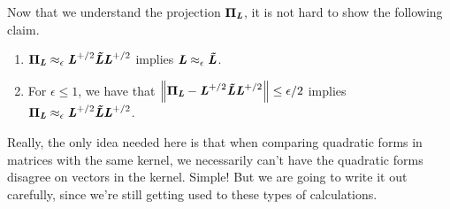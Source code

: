 Now that we understand the projection $\boldsymbol{\Pi}_{\boldsymbol{\mathit{L}}}$, it is not hard to
show the following claim.
\begin{claim}
  \label{clm:spectralreltoabs}
  \noindent
\begin{enumerate}
\item
\label{enu:switchapxnormalizer}
  $\boldsymbol{\Pi}_{\boldsymbol{\mathit{L}}} \approx_{\epsilon} \boldsymbol{\mathit{L}}^{+/2}\boldsymbol{\mathit{\tilde{L}}}\boldsymbol{\mathit{L}}^{+/2}$
  implies $\boldsymbol{\mathit{L}} \approx_{\epsilon} \boldsymbol{\mathit{\tilde{L}}}$.
\item
  \label{enu:normtoapx}
  For $\epsilon \leq 1$, we have that
  $\left\| \boldsymbol{\Pi}_{\boldsymbol{\mathit{L}}} - \boldsymbol{\mathit{L}}^{+/2}\boldsymbol{\mathit{\tilde{L}}}\boldsymbol{\mathit{L}}^{+/2} \right\| \leq
  \epsilon/2$ implies  $\boldsymbol{\Pi}_{\boldsymbol{\mathit{L}}} \approx_{\epsilon} \boldsymbol{\mathit{L}}^{+/2}\boldsymbol{\mathit{\tilde{L}}}\boldsymbol{\mathit{L}}^{+/2}$.
\end{enumerate}
\end{claim}
Really, the only idea needed here is that when comparing quadratic
forms in matrices with
the same kernel, we necessarily can't have the quadratic forms
disagree on vectors in the kernel.
Simple! But we are going to write it out carefully, since we're still
getting used to these types of calculations.
